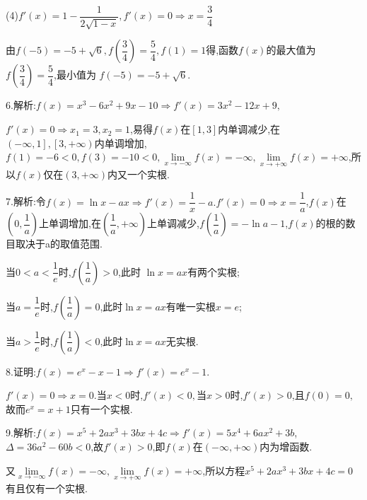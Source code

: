(4)$f'\left( x \right) = 1 - \dfrac{1}{{2\sqrt {1 - x} }},f'\left( x \right) = 0 \Rightarrow x = \dfrac{3}{4}$

由$f\left( { - 5} \right) =  - 5 + \sqrt 6 ,f\left( {\dfrac{3}{4}} \right) = \dfrac{5}{4},f\left( 1 \right) = 1$得,函数$f\left( x \right)$的最大值为$f\left( {\dfrac{3}{4}} \right) = \dfrac{5}{4}$,最小值为
$f\left( { - 5} \right) =  - 5 + \sqrt 6 $.

6.解析:$f\left( x \right) = {x^3} - 6{x^2} + 9x - 10 \Rightarrow f'\left( x \right) = 3{x^2} - 12x + 9,$

$f'\left( x \right) = 0 \Rightarrow {x_1} = 3,{x_2} = 1$,易得$f\left( x \right)$在$\left[ {1,3} \right]$内单调减少,在$\left( { - \infty ,1} \right],\left[ {3, + \infty } \right)$内单调增加,$f\left( 1 \right) =  - 6 < 0,f\left( 3 \right) =  - 10 < 0,\mathop {\lim }\limits_{x \to  - \infty } f\left( x \right) =  - \infty ,\mathop {\lim }\limits_{x \to  + \infty } f\left( x \right) =  + \infty $,所以$f\left( x \right)$仅在$\left( {3, + \infty } \right)$内又一个实根.

7.解析:令$f\left( x \right) = \ln x - ax \Rightarrow f'\left( x \right) = \dfrac{1}{x} - a.$$f'\left( x \right) = 0 \Rightarrow x = \dfrac{1}{a}$,$f\left( x \right)$在$\left( {0,\dfrac{1}{a}} \right)$上单调增加,在$\left( {\dfrac{1}{a}, + \infty } \right)$上单调减少,$f\left( {\dfrac{1}{a}} \right) =  - \ln a - 1$,$f\left( x \right)$的根的数目取决于a的取值范围.

当$0 < a < \dfrac{1}{e}$时,$f\left( {\dfrac{1}{a}} \right) > 0$,此时
$\ln x = ax$有两个实根;

当$a = \dfrac{1}{e}$时,$f\left( {\dfrac{1}{a}} \right) = 0$,此时$\ln x = ax$有唯一实根$x = e$;

当$a > \dfrac{1}{e}$时,$f\left( {\dfrac{1}{a}} \right) < 0$,此时$\ln x = ax$无实根.

8.证明:$f\left( x \right) = {e^x} - x - 1 \Rightarrow f'\left( x \right) = {e^x} - 1.$

$f'\left( x \right) = 0 \Rightarrow x = 0.$当$x < 0$时,$f'\left( x \right) < 0,$当$x > 0$时,$f'\left( x \right) > 0$,且$f\left( 0 \right) = 0,$故而$e^x = x + 1$只有一个实根.

9.解析:$f\left( x \right) = {x^5} + 2a{x^3} + 3bx + 4c \Rightarrow f'\left( x \right) = 5{x^4} + 6a{x^2} + 3b$,$\Delta  = 36{a^2} - 60b < 0$,故$f'\left( x \right) > 0$,即$f\left( x \right)$在$\left( { - \infty , + \infty } \right)$内为增函数.

又$\mathop {\lim }\limits_{x \to  - \infty } f\left( x \right) =  - \infty ,\mathop {\lim }\limits_{x \to  + \infty } f\left( x \right) =  + \infty $,所以方程${x^5} + 2a{x^3} + 3bx + 4c = 0$有且仅有一个实根.

